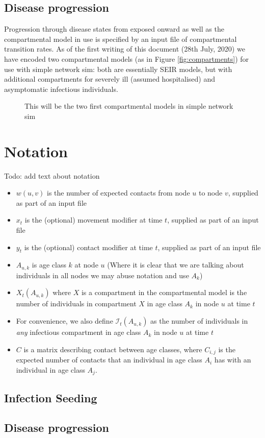 \documentclass[11pt]{article}
\begin{document}
\subsection{Disease progression}
Progression through disease states from exposed onward as well as the compartmental model in use is specified by an input file of compartmental transition rates.   As of the first writing of this document (28th July, 2020) we have encoded two compartmental models (as in Figure \ref{fig:compartments}) for use with simple network sim: both are essentially SEIR models, but with additional compartments for severely ill (assumed hospitalised) and asymptomatic infectious individuals.  

\begin{figure}
\caption{This will be the two first compartmental models in simple network sim}
\end{figure}



\section{Notation}
Todo: add text about notation

\begin{itemize}
\item $w(u, v)$ is the number of expected contacts from node $u$ to node $v$, supplied as part of an input file
\item $x_t$ is the (optional) movement modifier at time $t$, supplied as part of an input file
\item $y_t$ is the (optional) contact modifier at time $t$, supplied as part of an input file
\item $A_{u,k}$ is age class $k$ at node $u$ (Where it is clear that we are talking about individuals in all nodes we may abuse notation and use $A_k$)
\item $X_t(A_{u,k})$ where $X$ is a compartment in the compartmental model is the number of individuals in compartment $X$ in age class $A_k$ in node $u$ at time $t$
\item For convenience, we also define $\mathcal{I}_t(A_{u,k})$ as the number of individuals in \emph{any} infectious compartment in age class $A_k$ in node $u$ at time $t$
\item $C$ is a matrix describing contact between age classes, where $C_{i,j}$ is the expected number of contacts that an individual in age class $A_i$ has with an individual in age class $A_j$.
\end{itemize}


\subsection{Infection Seeding}

\subsection{Disease progression}
\end{document}
